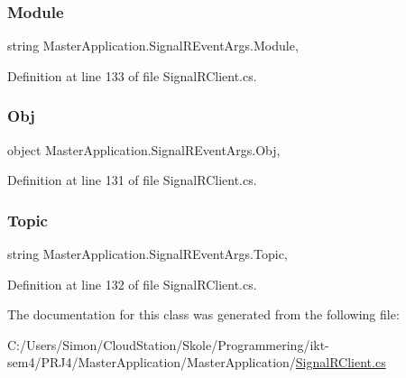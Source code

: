 \subsubsection{\texorpdfstring{Module}{Module}}
{\footnotesize\ttfamily string Master\+Application.\+Signal\+R\+Event\+Args.\+Module\hspace{0.3cm}{\ttfamily [get]}, {\ttfamily [set]}}



Definition at line 133 of file Signal\+R\+Client.\+cs.

\mbox{\label{class_master_application_1_1_signal_r_event_args_ace89df7fa55d53de03a1a9d411a9f596}} 
\subsubsection{\texorpdfstring{Obj}{Obj}}
{\footnotesize\ttfamily object Master\+Application.\+Signal\+R\+Event\+Args.\+Obj\hspace{0.3cm}{\ttfamily [get]}, {\ttfamily [set]}}



Definition at line 131 of file Signal\+R\+Client.\+cs.

\mbox{\label{class_master_application_1_1_signal_r_event_args_a4f744958b044e04c2dc9b70557fbd906}} 
\subsubsection{\texorpdfstring{Topic}{Topic}}
{\footnotesize\ttfamily string Master\+Application.\+Signal\+R\+Event\+Args.\+Topic\hspace{0.3cm}{\ttfamily [get]}, {\ttfamily [set]}}



Definition at line 132 of file Signal\+R\+Client.\+cs.



The documentation for this class was generated from the following file\+:\begin{DoxyCompactItemize}
\item 
C\+:/\+Users/\+Simon/\+Cloud\+Station/\+Skole/\+Programmering/ikt-\/sem4/\+P\+R\+J4/\+Master\+Application/\+Master\+Application/\mbox{\hyperlink{_signal_r_client_8cs}{Signal\+R\+Client.\+cs}}\end{DoxyCompactItemize}
